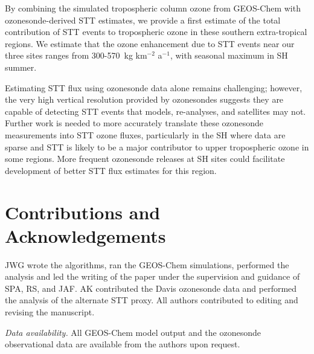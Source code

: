   By combining the simulated tropospheric column ozone from GEOS-Chem with ozonesonde-derived STT estimates, we provide a first estimate of the total contribution of STT events to tropospheric ozone in these southern extra-tropical regions.
  We estimate that the ozone enhancement due to STT events near our three sites ranges from 300-570~kg km$^{-2}$ a$^{-1}$, with seasonal maximum in SH summer.
  
  Estimating STT flux using ozonesonde data alone remains challenging; however, the very high vertical resolution provided by ozonesondes suggests  they are capable of detecting STT events that models, re-analyses, and satellites may not. 
  Further work is needed to more accurately translate these ozonesonde measurements into STT ozone fluxes, particularly in the SH where data are sparse and STT is likely to be a major contributor to upper tropospheric ozone in some regions.
  More frequent ozonesonde releases at SH sites could facilitate development of better STT flux estimates for this region.

\section{Contributions and Acknowledgements}
  JWG wrote the algorithms, ran the GEOS-Chem simulations, performed the analysis and led the writing of the paper under the supervision and guidance of SPA, RS, and JAF. 
  AK contributed the Davis ozonesonde data and performed the analysis of the alternate STT proxy. 
  All authors contributed to editing and revising the manuscript.

  
  
  \textit{Data availability.} All GEOS-Chem model output and the ozonesonde observational data are available from the authors upon request.

